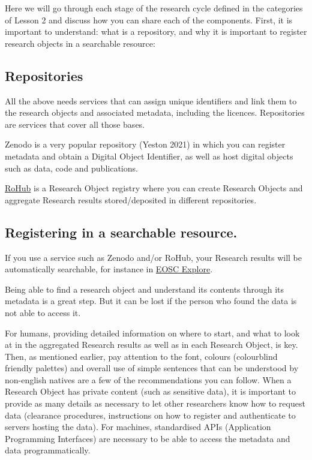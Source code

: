 \documentclass[
  letterpaper,
  DIV=11,
  numbers=noendperiod]{scrreport}
\begin{document}
Here we will go through each stage of the research cycle defined in the
categories of Lesson 2 and discuss how you can share each of the
components. First, it is important to understand: what is a repository,
and why it is important to register research objects in a searchable
resource:

\hypertarget{repositories}{%
\subsection{Repositories}\label{repositories}}

All the above needs services that can assign unique identifiers and link
them to the research objects and associated metadata, including the
licences. Repositories are services that cover all those bases.

Zenodo is a very popular repository (Yeston 2021) in which you can
register metadata and obtain a Digital Object Identifier, as well as
host digital objects such as data, code and publications.

\href{https://reliance.rohub.org/}{RoHub} is a Research Object registry
where you can create Research Objects and aggregate Research results
stored/deposited in different repositories.

\hypertarget{registering-in-a-searchable-resource.}{%
\subsection{Registering in a searchable
resource.}\label{registering-in-a-searchable-resource.}}

If you use a service such as Zenodo and/or RoHub, your Research results
will be automatically searchable, for instance in
\href{https://explore.eosc-portal.eu/}{EOSC Explore}.

Being able to find a research object and understand its contents through
its metadata is a great step. But it can be lost if the person who found
the data is not able to access it.

For humans, providing detailed information on where to start, and what
to look at in the aggregated Research results as well as in each
Research Object, is key. Then, as mentioned earlier, pay attention to
the font, colours (colourblind friendly palettes) and overall use of
simple sentences that can be understood by non-english natives are a few
of the recommendations you can follow. When a Research Object has
private content (such as sensitive data), it is important to provide as
many details as necessary to let other researchers know how to request
data (clearance procedures, instructions on how to register and
authenticate to servers hosting the data). For machines, standardised
APIs (Application Programming Interfaces) are necessary to be able to
access the metadata and data programmatically.
\end{document}
